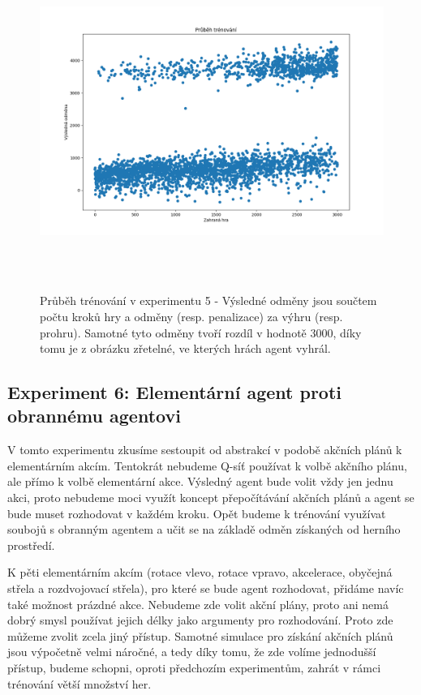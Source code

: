 \begin{figure}[H]\centering
    \includegraphics[width=145mm, height=110mm]{./Obrazky/Experiment05Training.png}
    \caption{Průběh trénování v experimentu 5 - Výsledné odměny jsou součtem počtu kroků hry a odměny (resp. penalizace) za výhru (resp. prohru). Samotné tyto odměny tvoří rozdíl v hodnotě 3000, díky tomu je z obrázku zřetelné, ve kterých hrách agent vyhrál.}
    \label{Průběh trénování experimentu 06}
    \end{figure}


\newpage
\subsection{Experiment 6: Elementární agent proti obrannému agentovi}
V tomto experimentu zkusíme sestoupit od abstrakcí v podobě akčních plánů k elementárním akcím.
Tentokrát nebudeme Q-síť používat k volbě akčního plánu, ale přímo k volbě elementární akce.
Výsledný agent bude volit vždy jen jednu akci, proto nebudeme moci využít koncept přepočítávání akčních plánů a agent se bude muset rozhodovat v každém kroku.
Opět budeme k trénování využívat soubojů s obranným agentem a učit se na základě odměn získaných od herního prostředí.

\par
K pěti elementárním akcím (rotace vlevo, rotace vpravo, akcelerace, obyčejná střela a rozdvojovací střela), pro které se bude agent rozhodovat, přidáme navíc také možnost prázdné akce. 
Nebudeme zde volit akční plány, proto ani nemá dobrý smysl používat jejich délky jako argumenty pro rozhodování. Proto zde můžeme zvolit zcela jiný přístup.
Samotné simulace pro získání akčních plánů jsou výpočetně velmi náročné, a tedy díky tomu, že zde volíme jednodušší přístup, budeme schopni, oproti předchozím experimentům, zahrát v rámci trénování větší množství her.

